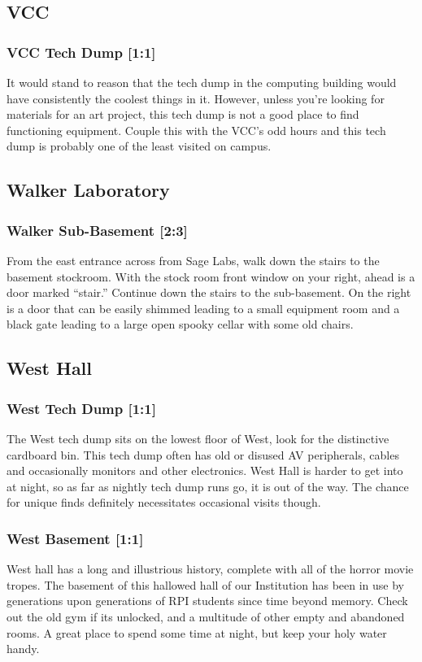\documentclass{article}
\begin{document}
\subsection{VCC}
\subsubsection{VCC Tech Dump [1:1]}
It would stand to reason that the tech dump in the computing building would have consistently the coolest things in it. However, unless you’re looking for materials for an art project, this tech dump is not a good place to find functioning equipment. Couple this with the VCC’s odd hours and this tech dump is probably one of the least visited on campus.



\pagebreak
\subsection{Walker Laboratory}
\subsubsection{Walker Sub-Basement [2:3]}
From the east entrance across from Sage Labs, walk down the stairs to the basement stockroom. With the stock room front window on your right, ahead is a door marked “stair.” Continue down the stairs to the sub-basement. On the right is a door that can be easily shimmed leading to a small equipment room and a black gate leading to a large open spooky cellar with some old chairs.



\pagebreak
\subsection{West Hall}
\subsubsection{West Tech Dump [1:1]}
The West tech dump sits on the lowest floor of West, look for the distinctive cardboard bin. This tech dump often has old or disused AV peripherals, cables and occasionally monitors and other electronics. West Hall is harder to get into at night, so as far as nightly tech dump runs go, it is out of the way. The chance for unique finds definitely necessitates occasional visits though.

\subsubsection{West Basement [1:1]}
West hall has a long and illustrious history, complete with all of the horror movie tropes. The basement of this hallowed hall of our Institution has been in use by generations upon generations of RPI students since time beyond memory. Check out the old gym if its unlocked, and a multitude of other empty and abandoned rooms. A great place to spend some time at night, but keep your holy water handy.
\end{document}
